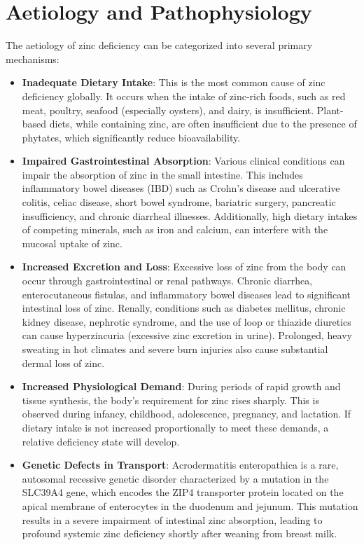 \section*{Aetiology and Pathophysiology}
The aetiology of zinc deficiency can be categorized into several primary mechanisms:
\begin{itemize}
    \item \textbf{Inadequate Dietary Intake}: This is the most common cause of zinc deficiency globally. It occurs when the intake of zinc-rich foods, such as red meat, poultry, seafood (especially oysters), and dairy, is insufficient. Plant-based diets, while containing zinc, are often insufficient due to the presence of phytates, which significantly reduce bioavailability.
    \item \textbf{Impaired Gastrointestinal Absorption}: Various clinical conditions can impair the absorption of zinc in the small intestine. This includes inflammatory bowel diseases (IBD) such as Crohn's disease and ulcerative colitis, celiac disease, short bowel syndrome, bariatric surgery, pancreatic insufficiency, and chronic diarrheal illnesses. Additionally, high dietary intakes of competing minerals, such as iron and calcium, can interfere with the mucosal uptake of zinc.
    \item \textbf{Increased Excretion and Loss}: Excessive loss of zinc from the body can occur through gastrointestinal or renal pathways. Chronic diarrhea, enterocutaneous fistulas, and inflammatory bowel diseases lead to significant intestinal loss of zinc. Renally, conditions such as diabetes mellitus, chronic kidney disease, nephrotic syndrome, and the use of loop or thiazide diuretics can cause hyperzincuria (excessive zinc excretion in urine). Prolonged, heavy sweating in hot climates and severe burn injuries also cause substantial dermal loss of zinc.
    \item \textbf{Increased Physiological Demand}: During periods of rapid growth and tissue synthesis, the body's requirement for zinc rises sharply. This is observed during infancy, childhood, adolescence, pregnancy, and lactation. If dietary intake is not increased proportionally to meet these demands, a relative deficiency state will develop.
    \item \textbf{Genetic Defects in Transport}: Acrodermatitis enteropathica is a rare, autosomal recessive genetic disorder characterized by a mutation in the SLC39A4 gene, which encodes the ZIP4 transporter protein located on the apical membrane of enterocytes in the duodenum and jejunum. This mutation results in a severe impairment of intestinal zinc absorption, leading to profound systemic zinc deficiency shortly after weaning from breast milk.
\end{itemize}

